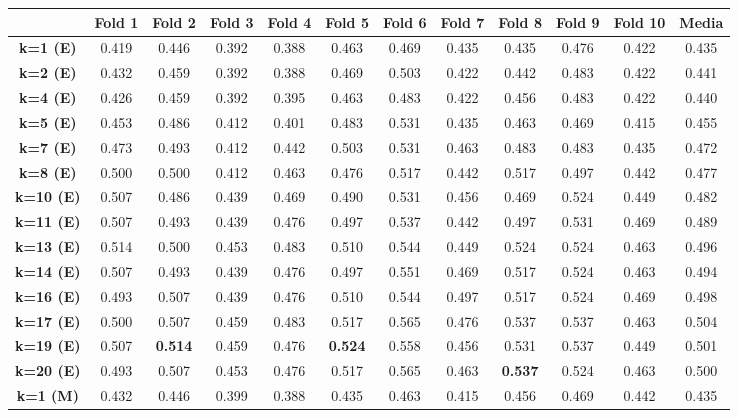 \documentclass[a4paper,12pt, oneside]{book}
\begin{document}
\scriptsize	
\begin{longtable}{@{}cccccccccccc@{}}
\toprule
 & \textbf{Fold 1} & \textbf{Fold 2} & \textbf{Fold 3} & \textbf{Fold 4} & \textbf{Fold 5} & \textbf{Fold 6} & \textbf{Fold 7} & \textbf{Fold 8} & \textbf{Fold 9} & \textbf{Fold 10} & \textbf{Media} \\* \midrule
\endhead
%
\bottomrule
\endfoot
%
\endlastfoot
%
\textbf{k=1 (E)} & 0.419 & 0.446 & 0.392 & 0.388 & 0.463 & 0.469 & 0.435 & 0.435 & 0.476 & 0.422 & 0.435 \\
\textbf{k=2 (E)} & 0.432 & 0.459 & 0.392 & 0.388 & 0.469 & 0.503 & 0.422 & 0.442 & 0.483 & 0.422 & 0.441 \\
\textbf{k=4 (E)} & 0.426 & 0.459 & 0.392 & 0.395 & 0.463 & 0.483 & 0.422 & 0.456 & 0.483 & 0.422 & 0.440 \\
\textbf{k=5 (E)} & 0.453 & 0.486 & 0.412 & 0.401 & 0.483 & 0.531 & 0.435 & 0.463 & 0.469 & 0.415 & 0.455
 \\
\textbf{k=7 (E)}   & 0.473 & 0.493 & 0.412 & 0.442 & 0.503 & 0.531 & 0.463 & 0.483 & 0.483 & 0.435 & 0.472
\\
\textbf{k=8 (E)}   & 0.500 & 0.500 & 0.412 & 0.463 & 0.476 & 0.517 & 0.442 & 0.517 & 0.497 & 0.442 & 0.477
\\
\textbf{k=10 (E)}   & 0.507 & 0.486 & 0.439 & 0.469 & 0.490 & 0.531 & 0.456 & 0.469 & 0.524 & 0.449 & 0.482
\\
\textbf{k=11 (E)}  & 0.507 & 0.493 & 0.439 & 0.476 & 0.497 & 0.537 & 0.442 & 0.497 & 0.531 & 0.469 & 0.489
 \\
\textbf{k=13 (E)}   & 0.514 & 0.500 & 0.453 & 0.483 & 0.510 & 0.544 & 0.449 & 0.524 & 0.524 & 0.463 & 0.496
\\
\textbf{k=14 (E)}  & 0.507 & 0.493 & 0.439 & 0.476 & 0.497 & 0.551 & 0.469 & 0.517 & 0.524 & 0.463 & 0.494
 \\
\textbf{k=16 (E)}   & 0.493 & 0.507 & 0.439 & 0.476 & 0.510 & 0.544 & 0.497 & 0.517 & 0.524 & 0.469 & 0.498
\\
\textbf{k=17 (E)}   & 0.500 & 0.507 & 0.459 & 0.483 & 0.517 & 0.565 & 0.476 & 0.537 & 0.537 & 0.463 & 0.504
\\
\textbf{k=19 (E)}  & 0.507 & \textbf{0.514} & 0.459 & 0.476 & \textbf{0.524} & 0.558 & 0.456 & 0.531 & 0.537 & 0.449 & 0.501
 \\
\textbf{k=20 (E)}  & 0.493 & 0.507 & 0.453 & 0.476 & 0.517 & 0.565 & 0.463 & \textbf{0.537} & 0.524 & 0.463 & 0.500
 \\
\textbf{k=1 (M)}   & 0.432 & 0.446 & 0.399 & 0.388 & 0.435 & 0.463 & 0.415 & 0.456 & 0.469 & 0.442 & 0.435

\end{longtable}
\end{document}
